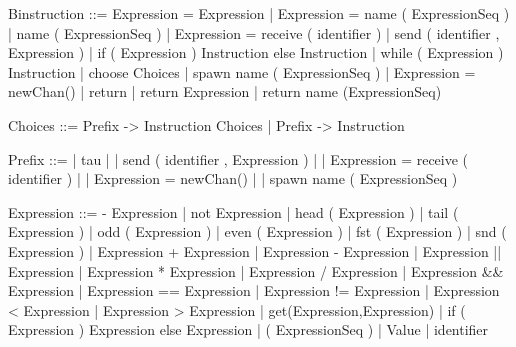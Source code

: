 \documentclass[11pt]{report}
\begin{document}
\begin{verbnobox}[\normalfont]
Binstruction ::= Expression = Expression 
                 | Expression = name ( ExpressionSeq )
                 | name ( ExpressionSeq )
                 | Expression = receive ( identifier )
                 | send ( identifier , Expression )
                 | if ( Expression ) { Instruction } else { Instruction }
                 | while ( Expression ) { Instruction }
                 | choose { Choices }
                 | spawn name ( ExpressionSeq )
                 | Expression = newChan()
                 | return
                 | return Expression
                 | return name (ExpressionSeq)
\end{verbnobox}
\vspace*{3pt}

\begin{verbnobox}[\normalfont]
Choices ::= Prefix -> { Instruction } Choices | Prefix -> { Instruction }
\end{verbnobox}
\vspace*{3pt}

\begin{verbnobox}[\normalfont]
Prefix ::= | tau
         | | send ( identifier , Expression )
         | | Expression = receive ( identifier )
         | | Expression = newChan()
         | | spawn name ( ExpressionSeq )
\end{verbnobox}
\vspace*{3pt}

\begin{verbnobox}[\normalfont]
Expression ::= - Expression
               | not Expression
               | head ( Expression )
               | tail ( Expression )
               | odd ( Expression )
               | even ( Expression )
               | fst ( Expression )
               | snd ( Expression )
               | Expression + Expression
               | Expression - Expression
               | Expression || Expression
               | Expression * Expression
               | Expression / Expression
               | Expression && Expression
               | Expression == Expression
               | Expression != Expression 
               | Expression < Expression
               | Expression > Expression
               | get(Expression,Expression)
               | if ( Expression ) { Expression } else { Expression }
               | ( ExpressionSeq )
               | Value
               | identifier
\end{verbnobox}
\vspace*{3pt}
\end{document}

